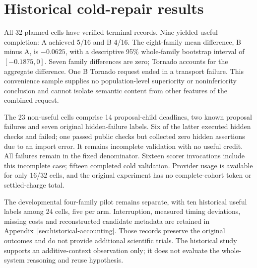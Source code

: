 \section{Historical cold-repair results}
\label{sec:results}

All 32 planned cells have verified terminal records. Nine yielded useful
completion: A achieved 5/16 and B 4/16. The eight-family mean difference,
B minus A, is $-0.0625$, with a descriptive 95\% whole-family bootstrap interval
of $[-0.1875,0]$. Seven family differences are zero; Tornado accounts for the
aggregate difference. One B Tornado request ended in a transport failure.
This convenience sample supplies no population-level superiority or
noninferiority conclusion and cannot isolate semantic content from other
features of the combined request.

The 23 non-useful cells comprise 14 proposal-child deadlines, two known proposal
failures and seven original hidden-failure labels. Six of the latter executed
hidden checks and failed; one passed public checks but collected zero hidden
assertions due to an import error. It remains incomplete validation with no
useful credit. All failures remain in the fixed denominator. Sixteen scorer
invocations include this incomplete case; fifteen completed cold validation.
Provider usage is available for only 16/32 cells, and the original experiment
has no complete-cohort token or settled-charge total.

The developmental four-family pilot remains separate, with ten historical
useful labels among 24 cells, five per arm. Interruption, measured timing
deviations, missing costs and reconstructed candidate metadata are retained
in Appendix~\ref{sec:historical-accounting}. Those records preserve the original
outcomes and do not provide additional scientific trials. The historical study
supports an additive-context observation only; it does not evaluate the
whole-system reasoning and reuse hypothesis.
